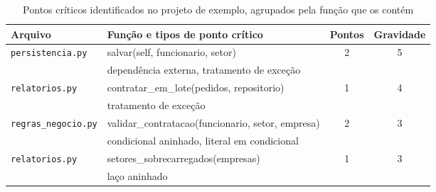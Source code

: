 \begin{table}[htbp]
  \centering
  \caption{Pontos críticos identificados no projeto de exemplo, agrupados pela função que os contém}
  \label{tab:pontos}
  \begin{tabular}{p{3.0cm}p{6.6cm}cc}
    \toprule
    \textbf{Arquivo} & \textbf{Função e tipos de ponto crítico} & \textbf{Pontos} & \textbf{Gravidade} \\
    \midrule
    \texttt{persistencia.py} & salvar(self, funcionario, setor) & 2 & 5 \\
     & \footnotesize dependência externa, tratamento de exceção & & \\
    \texttt{relatorios.py} & contratar\_em\_lote(pedidos, repositorio) & 1 & 4 \\
     & \footnotesize tratamento de exceção & & \\
    \texttt{regras\_negocio.py} & validar\_contratacao(funcionario, setor, empresa) & 2 & 3 \\
     & \footnotesize condicional aninhado, literal em condicional & & \\
    \texttt{relatorios.py} & setores\_sobrecarregados(empresas) & 1 & 3 \\
     & \footnotesize laço aninhado & & \\
    \bottomrule
  \end{tabular}
\end{table}
